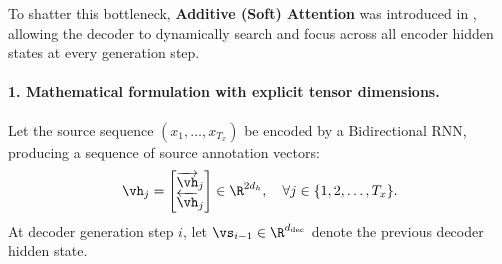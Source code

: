 \documentclass[../../main.tex]{subfiles}
\begin{document}
To shatter this bottleneck, \textbf{Additive (Soft) Attention} was introduced in \cite{bahdanau2014}, allowing the decoder to dynamically search and focus across all encoder hidden states at every generation step.

\paragraph{1. Mathematical formulation with explicit tensor dimensions.}
Let the source sequence $(x_1, \dots, x_{T_x})$ be encoded by a Bidirectional RNN, producing a sequence of source annotation vectors:
\begin{equation}
\vh_j = \begin{bmatrix} \overrightarrow{\vh}_j \\ \overleftarrow{\vh}_j \end{bmatrix} \in \R^{2d_h}, \quad \forall j \in \{1, 2, \dots, T_x\}.
\end{equation}
At decoder generation step $i$, let $\vs_{i-1} \in \R^{d_{\text{dec}}}$ denote the previous decoder hidden state.
\end{document}
